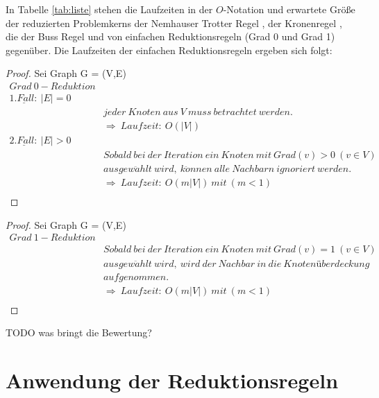 In Tabelle \ref{tab:liste} stehen die Laufzeiten in der $O$-Notation und erwartete Größe der reduzierten Problemkerns der Nemhauser Trotter Regel \cite[S67]{fixed}, der Kronenregel \cite[S71]{fixed} \cite{manual}, die der Buss Regel \cite[S67]{fixed} und von einfachen Reduktionsregeln (Grad 0 und Grad 1) gegenüber. Die Laufzeiten der einfachen Reduktionsregeln ergeben sich folgt:
\begin{proof}
 Sei Graph G = (V,E)
	\begin{align*}
  		Grad\ 0-Reduktion\\
  		\underline{1.Fall:}\ |E|=0&\\
  		&jeder\ Knoten\ aus\ V\ muss\ betrachtet\ werden.\\
  		&\Rightarrow\ Laufzeit:\ O(|V|)\\  		
  		\underline{2.Fall:}\ |E|>0&\\
  		&Sobald\ bei\ der\ Iteration\ ein\ Knoten\ mit\ Grad(v)>0\ (v\in V)\ \\
  		&ausgew\ddot{a}hlt\ wird,\ k\ddot{o}nnen\ alle\ Nachbarn\ ignoriert\ werden.\\
  		&\Rightarrow\ Laufzeit:\ O(m|V|)\ mit\ (m<1)\\
	\end{align*}
\end{proof}
\begin{proof}
 Sei Graph G = (V,E)
	\begin{align*}
  		Grad\ 1-Reduktion\\
  		&Sobald\ bei\ der\ Iteration\ ein\ Knoten\ mit\ Grad(v)=1\ (v\in V)\ \\
  		&ausgew\ddot{a}hlt\ wird,\ wird\ der\ Nachbar\ in\ die\ Knotenüberdeckung\\
  		&aufgenommen.\\
  		&\Rightarrow\ Laufzeit:\ O(m|V|)\ mit\ (m<1)\\
	\end{align*}
\end{proof}

TODO was bringt die Bewertung?

\section{Anwendung der Reduktionsregeln}
\label{ch:Analyse:sec:Anwendung}


